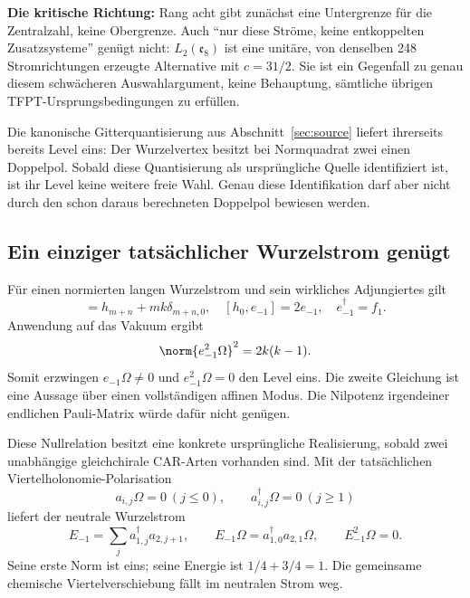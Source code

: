 \textbf{Die kritische Richtung:} Rang acht gibt zunächst eine Untergrenze für die Zentralzahl, keine Obergrenze. Auch ``nur diese Ströme, keine entkoppelten Zusatzsysteme'' genügt nicht: $L_2(\mathfrak e_8)$ ist eine unitäre, von denselben 248 Stromrichtungen erzeugte Alternative mit $c=31/2$. Sie ist ein Gegenfall zu genau diesem schwächeren Auswahlargument, keine Behauptung, sämtliche übrigen TFPT-Ursprungsbedingungen zu erfüllen.

Die kanonische Gitterquantisierung aus Abschnitt~\ref{sec:source} liefert ihrerseits bereits Level eins: Der Wurzelvertex besitzt bei Normquadrat zwei einen Doppelpol. Sobald diese Quantisierung als ursprüngliche Quelle identifiziert ist, ist ihr Level keine weitere freie Wahl. Genau diese Identifikation darf aber nicht durch den schon daraus berechneten Doppelpol bewiesen werden.

\subsection{Ein einziger tatsächlicher Wurzelstrom genügt}
Für einen normierten langen Wurzelstrom und sein wirkliches Adjungiertes gilt
\begin{equation}
[e_m,f_n]=h_{m+n}+mk\delta_{m+n,0},\quad
[h_0,e_{-1}]=2e_{-1},\quad e_{-1}^{\dagger}=f_1.
\end{equation}
Anwendung auf das Vakuum ergibt
\begin{equation}\label{eq:rootnull}
\norm{e_{-1}^2\Omega}^2=2k(k-1).
\end{equation}
Somit erzwingen $e_{-1}\Omega\ne0$ und $e_{-1}^2\Omega=0$ den Level eins. Die zweite Gleichung ist eine Aussage über einen vollständigen affinen Modus. Die Nilpotenz irgendeiner endlichen Pauli-Matrix würde dafür nicht genügen.

Diese Nullrelation besitzt eine konkrete ursprüngliche Realisierung, sobald zwei unabhängige gleichchirale CAR-Arten vorhanden sind. Mit der tatsächlichen Viertelholonomie-Polarisation
\begin{equation}
a_{i,j}\Omega=0\ (j\le0),\qquad
a^\dagger_{i,j}\Omega=0\ (j\ge1)
\end{equation}
liefert der neutrale Wurzelstrom
\begin{equation}
E_{-1}=\sum_j a^\dagger_{1,j}a_{2,j+1},\qquad
E_{-1}\Omega=a^\dagger_{1,0}a_{2,1}\Omega,\qquad E_{-1}^2\Omega=0.
\end{equation}
Seine erste Norm ist eins; seine Energie ist $1/4+3/4=1$. Die gemeinsame chemische Viertelverschiebung fällt im neutralen Strom weg.

